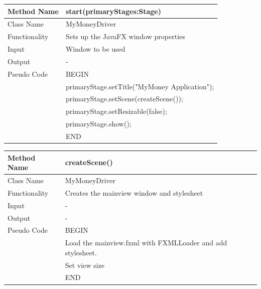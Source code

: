 \documentclass[12pt]{article}
\begin{document}
\begin{tabular}{ |p{3cm}||p{\colWidth}|  }
	\hline
	Method Name &  start(primaryStages:Stage) \\
	\hline
	Class Name & MyMoneyDriver\\
	\hline
	Functionality & Sets up the JavaFX window properties\\
	\hline
	Input & Window to be used\\
	\hline
	Output & -\\
	\hline
	Pseudo Code & BEGIN \\
	& 	primaryStage.setTitle("MyMoney Application");\\
	& 	primaryStage.setScene(createScene());\\
	& primaryStage.setResizable(false);\\
	& primaryStage.show();\\
	& END\\
	\hline
\end{tabular}  

\begin{tabular}{ |p{3cm}||p{\colWidth}|  }
	\hline
	Method Name &  createScene() \\
	\hline
	Class Name & MyMoneyDriver\\
	\hline
	Functionality & Creates the mainview window and stylesheet\\
	\hline
	Input & -\\
	\hline
	Output & -\\
	\hline
	Pseudo Code & BEGIN \\
	& Load the mainview.fxml with FXMLLoader and add stylesheet.\\
	& Set view size\\
	& END \\
	\hline
\end{tabular}  
\end{document}
